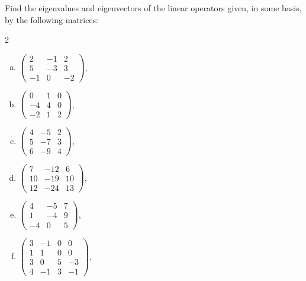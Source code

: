 \begin{problem}
Find the eigenvalues and eigenvectors of the linear operators given, in some basis, by the following matrices:
\begin{multicols}{2}
\begin{enumerate}[a) ]
\item $\begin{pmatrix}2 & -1 & 2 \\ 5 & -3 & 3 \\ -1 & 0 & -2\end{pmatrix}$,
\item $\begin{pmatrix}0 & 1 & 0 \\ -4 & 4 & 0 \\ -2 & 1 & 2\end{pmatrix}$,
\item $\begin{pmatrix}4 & -5 & 2 \\ 5 & -7 & 3 \\ 6 & -9 & 4\end{pmatrix}$,
\item $\begin{pmatrix}7 & -12 & 6 \\ 10 & -19 & 10 \\ 12 & -24 & 13\end{pmatrix}$,
\item $\begin{pmatrix}4 & -5 & 7 \\ 1 & -4 & 9 \\ -4 & 0 & 5\end{pmatrix}$,
\item $\begin{pmatrix}3 & -1 & 0 & 0 \\ 1 & 1 & 0 & 0 \\ 3 & 0 & 5 & -3 \\ 4 & -1 & 3 & -1\end{pmatrix}$.
\end{enumerate}
\end{multicols}
\end{problem}

